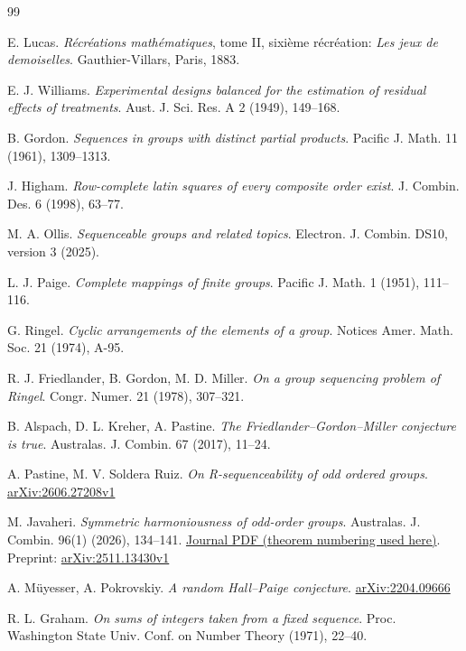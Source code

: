 \begin{thebibliography}{99}

 E. Lucas. \emph{R\'ecr\'eations math\'ematiques}, tome II, sixi\`eme r\'ecr\'eation: \emph{Les jeux de demoiselles}. Gauthier-Villars, Paris, 1883.

 E. J. Williams. \emph{Experimental designs balanced for the estimation of residual effects of treatments}. Aust. J. Sci. Res. A 2 (1949), 149--168.

 B. Gordon. \emph{Sequences in groups with distinct partial products}. Pacific J. Math. 11 (1961), 1309--1313.

 J. Higham. \emph{Row-complete latin squares of every composite order exist}. J. Combin. Des. 6 (1998), 63--77.

 M. A. Ollis. \emph{Sequenceable groups and related topics}. Electron. J. Combin. DS10, version 3 (2025).

 L. J. Paige. \emph{Complete mappings of finite groups}. Pacific J. Math. 1 (1951), 111--116.

 G. Ringel. \emph{Cyclic arrangements of the elements of a group}. Notices Amer. Math. Soc. 21 (1974), A-95.

 R. J. Friedlander, B. Gordon, M. D. Miller. \emph{On a group sequencing problem of Ringel}. Congr. Numer. 21 (1978), 307--321.

 B. Alspach, D. L. Kreher, A. Pastine. \emph{The Friedlander--Gordon--Miller conjecture is true}. Australas. J. Combin. 67 (2017), 11--24.

 A. Pastine, M. V. Soldera Ruiz. \emph{On R-sequenceability of odd ordered groups}. \href{https://arxiv.org/abs/2606.27208v1}{arXiv:2606.27208v1}

 M. Javaheri. \emph{Symmetric harmoniousness of odd-order groups}. Australas. J. Combin. 96(1) (2026), 134--141. \href{https://ajc.maths.uq.edu.au/download/96/ajc_v96_p134.pdf}{Journal PDF (theorem numbering used here)}. Preprint: \href{https://arxiv.org/abs/2511.13430v1}{arXiv:2511.13430v1}

 A. M\"uyesser, A. Pokrovskiy. \emph{A random Hall--Paige conjecture}. \href{https://arxiv.org/abs/2204.09666}{arXiv:2204.09666}

 R. L. Graham. \emph{On sums of integers taken from a fixed sequence}. Proc. Washington State Univ. Conf. on Number Theory (1971), 22--40.


\end{thebibliography}

